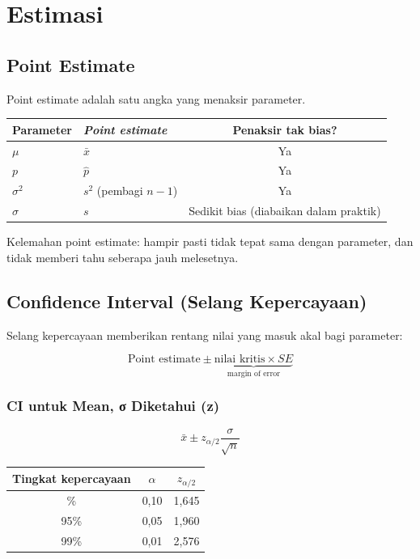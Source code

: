 \documentclass[
  indonesian,
  letterpaper,
]{book}
\newcounter{none} %
\begin{document}

\chapter{Estimasi}\label{estimasi}

\section{Point Estimate}\label{point-estimate}

Point estimate adalah satu angka yang menaksir parameter.

{\def\LTcaptype{none} %
\begin{longtable}[]{@{}llc@{}}
\toprule\noalign{}
Parameter & \emph{Point estimate} & Penaksir tak bias? \\
\midrule\noalign{}
\endhead
\bottomrule\noalign{}
\endlastfoot
\(\mu\) & \(\bar{x}\) & Ya \\
\(p\) & \(\hat{p}\) & Ya \\
\(\sigma^2\) & \(s^2\) (pembagi \(n-1\)) & Ya \\
\(\sigma\) & \(s\) & Sedikit bias (diabaikan dalam praktik) \\
\end{longtable}
}

Kelemahan point estimate: hampir pasti tidak tepat sama dengan
parameter, dan tidak memberi tahu seberapa jauh melesetnya.

\section{Confidence Interval (Selang
Kepercayaan)}\label{confidence-interval-selang-kepercayaan}

Selang kepercayaan memberikan rentang nilai yang masuk akal bagi
parameter:

\[\text{Point estimate} \pm \underbrace{\text{nilai kritis} \times SE}_{\text{margin of error}}\]

\subsection{CI untuk Mean, σ Diketahui
(z)}\label{ci-untuk-mean-ux3c3-diketahui-z}

\[\bar{x} \pm z_{\alpha/2} \dfrac{\sigma}{\sqrt{n}}\]

{\def\LTcaptype{none} %
\begin{longtable}[]{@{}ccc@{}}
\toprule\noalign{}
Tingkat kepercayaan & \(\alpha\) & \(z_{\alpha/2}\) \\
\midrule\noalign{}
\endhead
\bottomrule\noalign{}
\endlastfoot
90\% & 0,10 & 1,645 \\
95\% & 0,05 & 1,960 \\
99\% & 0,01 & 2,576 \\
\end{longtable}
}
\end{document}
